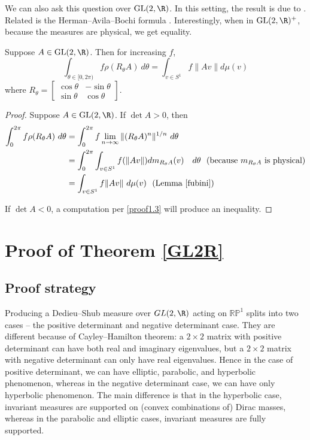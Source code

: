 \documentclass[10pt]{amsart}
\numberwithin{equation}{section}     %
\newcommand{\RP}{\mathbb{RP}}
\newcommand{\GL}{\mathrm{GL}}
\begin{document}
\subsubsection{} We can also ask this question over $\GL(2,\R)$. In this setting, the result  is due to \cite{dedieu2003mike}. Related is the Herman--Avila--Bochi formula \cite{AvilaBochiFormula}. Interestingly, when in $\GL(2,\R)^+$, because the measures are physical, we get equality.

\begin{proposition}
    Suppose $A \in \GL(2,\R)$. Then for increasing $f$, $$\int_{\theta \in [0,2\pi)} f \rho(R_\theta A) \ d\theta = \int_{v \in S^1} f\|Av\| d\mu(v)$$ where $R_\theta = \begin{bmatrix}
        \cos \theta & - \sin \theta \\ 
        \sin \theta & \cos \theta
    \end{bmatrix}$.
\end{proposition}

\begin{proof}
    Suppose $A \in \GL(2,\R)$. 
    If $\det A > 0$, then \begin{align*}
        \int_{0}^{2\pi} f \rho(R_\theta A) \ d\theta &= \int_{0}^{2\pi} f \lim \limits_{n \to \infty} \|(R_{\theta} A)^n\|^{1/n} \ d\theta  \\
        &= \int_{0}^{2\pi} \int_{v \in S^1 }f(\| A v\| ) d m_{R_\theta A}(v) \ \ \  d\theta \ \ (\text{because} \ m_{R_\theta A} \ \text{is physical})\\
        &= \int_{v \in S^1} f\|Av\| \ d\mu(v)  \ \ (\text{Lemma} \ \ref{fubini})
    \end{align*}

    If $\det A < 0$, a computation per \ref{proof1.3} will produce an inequality. 
\end{proof}

\section{Proof of Theorem \ref{GL2R}}


\subsection{Proof strategy}
Producing a Dedieu--Shub measure over $GL(2,\R)$ acting on $\RP^1$ splits into two cases -- the positive determinant and negative determinant case. They are different because of Cayley--Hamilton theorem: a $2 \times 2$ matrix with positive determinant can have both real and imaginary eigenvalues, but a $2 \times 2$ matrix with negative determinant can only have real eigenvalues. Hence in the case of positive determinant, we can have elliptic, parabolic, and hyperbolic phenomenon, whereas in the negative determinant case, we can have only hyperbolic phenomenon. The main difference is that in the hyperbolic case, invariant measures are supported on (convex combinations of) Dirac masses, whereas in the parabolic and elliptic cases, invariant measures are fully supported. 
\end{document}
